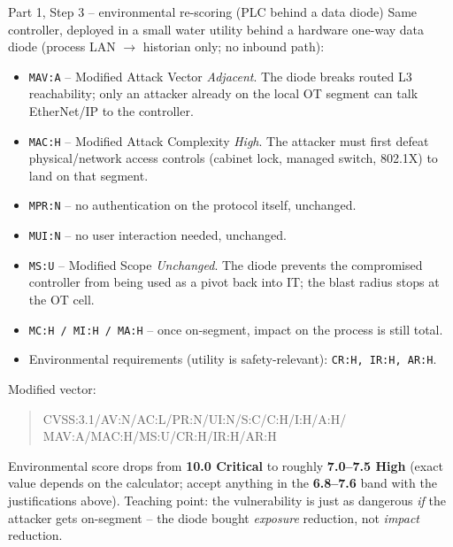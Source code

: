 \documentclass[11pt,a4paper]{article}
\begin{document}
\begin{solutionbox}{Part 1, Step 3 -- environmental re-scoring (PLC behind a data diode)}
Same controller, deployed in a small water utility behind a hardware one-way data diode (process LAN $\rightarrow$ historian only; no inbound path):

\begin{itemize}[leftmargin=*, nosep]
  \item \texttt{MAV:A} -- Modified Attack Vector \emph{Adjacent}. The diode breaks routed L3 reachability; only an attacker already on the local OT segment can talk EtherNet/IP to the controller.
  \item \texttt{MAC:H} -- Modified Attack Complexity \emph{High}. The attacker must first defeat physical/network access controls (cabinet lock, managed switch, 802.1X) to land on that segment.
  \item \texttt{MPR:N} -- no authentication on the protocol itself, unchanged.
  \item \texttt{MUI:N} -- no user interaction needed, unchanged.
  \item \texttt{MS:U} -- Modified Scope \emph{Unchanged}. The diode prevents the compromised controller from being used as a pivot back into IT; the blast radius stops at the OT cell.
  \item \texttt{MC:H / MI:H / MA:H} -- once on-segment, impact on the process is still total.
  \item Environmental requirements (utility is safety-relevant): \texttt{CR:H, IR:H, AR:H}.
\end{itemize}

Modified vector:
\begin{quote}
\ttfamily\small CVSS:3.1/AV:N/AC:L/PR:N/UI:N/S:C/C:H/I:H/A:H/\\MAV:A/MAC:H/MS:U/CR:H/IR:H/AR:H
\end{quote}

Environmental score drops from \textbf{10.0 Critical} to roughly \textbf{7.0--7.5 High} (exact value depends on the calculator; accept anything in the \textbf{6.8--7.6} band with the justifications above). Teaching point: the vulnerability is just as dangerous \emph{if} the attacker gets on-segment -- the diode bought \emph{exposure} reduction, not \emph{impact} reduction.
\end{solutionbox}
\end{document}
